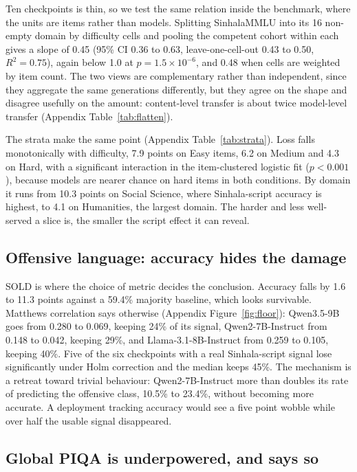 \documentclass[11pt]{article}
\begin{document}
Ten checkpoints is thin, so we test the same relation inside the benchmark, where
the units are items rather than models. Splitting SinhalaMMLU into its 16 non-empty
domain by difficulty cells and pooling the competent cohort within each gives a
slope of 0.45 (95\% CI 0.36 to 0.63, leave-one-cell-out 0.43 to 0.50,
$R^2 = 0.75$), again below 1.0 at $p = 1.5 \times 10^{-6}$, and 0.48 when cells are
weighted by item count. The two views are complementary rather than independent,
since they aggregate the same generations differently, but they agree on the shape
and disagree usefully on the amount: content-level transfer is about twice
model-level transfer (Appendix Table~\ref{tab:flatten}).

The strata make the same point (Appendix Table~\ref{tab:strata}). Loss falls
monotonically with difficulty, 7.9 points on Easy items, 6.2 on Medium and 4.3 on
Hard, with a significant interaction in the item-clustered logistic fit
($p < 0.001$), because models are nearer chance on hard items in both conditions. By
domain it runs from 10.3 points on Social Science, where Sinhala-script accuracy is
highest, to 4.1 on Humanities, the largest domain. The harder and less well-served a
slice is, the smaller the script effect it can reveal.

\subsection{Offensive language: accuracy hides the damage}

SOLD is where the choice of metric decides the conclusion. Accuracy falls by 1.6 to
11.3 points against a 59.4\% majority baseline, which looks survivable. Matthews
correlation says otherwise (Appendix Figure~\ref{fig:floor}): Qwen3.5-9B goes from
0.280 to 0.069, keeping 24\% of its signal, Qwen2-7B-Instruct from 0.148 to 0.042,
keeping 29\%, and Llama-3.1-8B-Instruct from 0.259 to 0.105, keeping 40\%. Five of
the six checkpoints with a real Sinhala-script signal lose significantly under Holm
correction and the median keeps 45\%. The mechanism is a retreat toward trivial
behaviour: Qwen2-7B-Instruct more than doubles its rate of predicting the offensive
class, 10.5\% to 23.4\%, without becoming more accurate. A deployment tracking
accuracy would see a five point wobble while over half the usable signal
disappeared.

\subsection{Global PIQA is underpowered, and says so}
\end{document}
